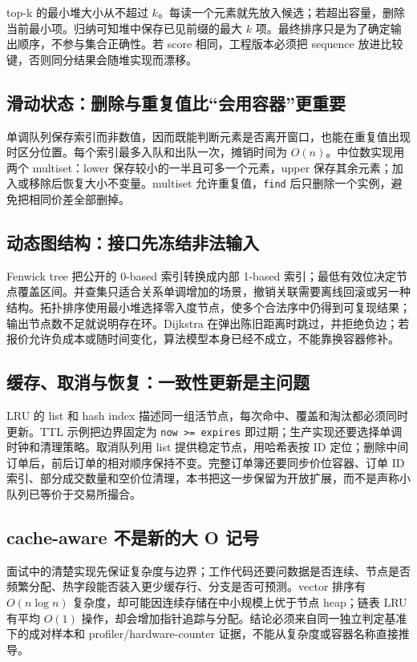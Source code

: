 top-k 的最小堆大小从不超过 \(k\)。每读一个元素就先放入候选；若超出容量，删除当前最小项。归纳可知堆中保存已见前缀的最大 \(k\) 项。最终排序只是为了确定输出顺序，不参与集合正确性。若 score 相同，工程版本必须把 sequence 放进比较键，否则同分结果会随堆实现而漂移。

\subsection{滑动状态：删除与重复值比“会用容器”更重要}

单调队列保存索引而非数值，因而既能判断元素是否离开窗口，也能在重复值出现时区分位置。每个索引最多入队和出队一次，摊销时间为 \(O(n)\)。中位数实现用两个 multiset：lower 保存较小的一半且可多一个元素，upper 保存其余元素；加入或移除后恢复大小不变量。multiset 允许重复值，\texttt{find} 后只删除一个实例，避免把相同价差全部删掉。

\subsection{动态图结构：接口先冻结非法输入}

Fenwick tree 把公开的 0-based 索引转换成内部 1-based 索引；最低有效位决定节点覆盖区间。并查集只适合关系单调增加的场景，撤销关联需要离线回滚或另一种结构。拓扑排序使用最小堆选择零入度节点，使多个合法序中仍得到可复现结果；输出节点数不足就说明存在环。Dijkstra 在弹出陈旧距离时跳过，并拒绝负边；若报价允许负成本或随时间变化，算法模型本身已经不成立，不能靠换容器修补。

\subsection{缓存、取消与恢复：一致性更新是主问题}

LRU 的 list 和 hash index 描述同一组活节点，每次命中、覆盖和淘汰都必须同时更新。TTL 示例把边界固定为 \texttt{now >= expires} 即过期；生产实现还要选择单调时钟和清理策略。取消队列用 list 提供稳定节点，用哈希表按 ID 定位；删除中间订单后，前后订单的相对顺序保持不变。完整订单簿还要同步价位容器、订单 ID 索引、部分成交数量和空价位清理，本书把这一步保留为开放扩展，而不是声称小队列已等价于交易所撮合。

\subsection{cache-aware 不是新的大 O 记号}

面试中的清楚实现先保证复杂度与边界；工作代码还要问数据是否连续、节点是否频繁分配、热字段能否装入更少缓存行、分支是否可预测。vector 排序有 \(O(n\log n)\) 复杂度，却可能因连续存储在中小规模上优于节点 heap；链表 LRU 有平均 \(O(1)\) 操作，却会增加指针追踪与分配。结论必须来自同一独立判定基准下的成对样本和 profiler/hardware-counter 证据，不能从复杂度或容器名称直接推导。

